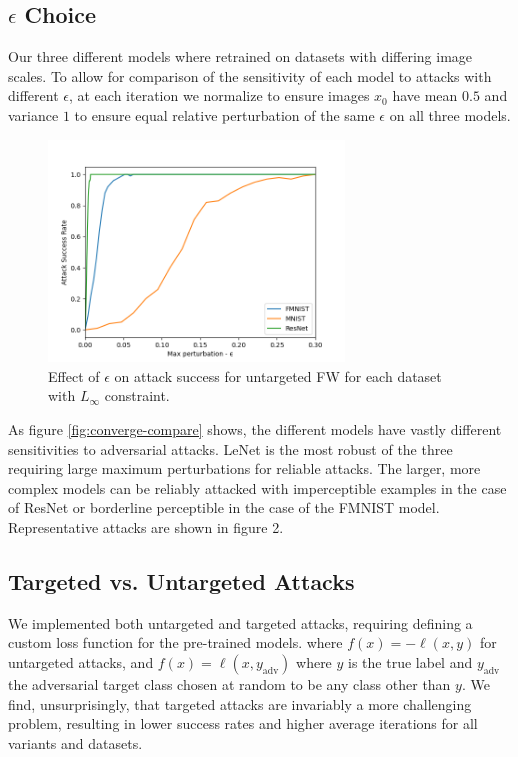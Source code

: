 \documentclass{article}
\begin{document}
\subsection{$\epsilon$ Choice}
Our three different models where retrained on datasets with differing image scales. To allow for comparison of the sensitivity of each model to attacks with different $\epsilon$, at each iteration we normalize to ensure images $x_0$ have mean $0.5$ and variance $1$ to ensure equal relative perturbation of the same $\epsilon$ on all three models. 

\begin{figure}[H]
    \centering
    \includegraphics[width=0.7\textwidth]{plots/eps_choice.png}
    \caption{Effect of $\epsilon$ on attack success for untargeted FW for each dataset with $L_\infty$ constraint.}
    \label{fig:eps}
\end{figure}

As figure \ref{fig:converge-compare} shows, the different models have vastly different sensitivities to adversarial attacks. LeNet is the most robust of the three requiring large maximum perturbations for reliable attacks. The larger, more complex models can be reliably attacked with imperceptible examples in the case of ResNet or borderline perceptible in the case of the FMNIST model. Representative attacks are shown in figure 2.

\subsection{Targeted vs. Untargeted Attacks}
We implemented both untargeted and targeted attacks, requiring defining a custom loss function for the pre-trained models. where $f(x) = -\ell(x, y)$ for untargeted attacks, and $f(x) = \ell(x, y_\text{adv})$ where $y$ is the true label and $y_\text{adv}$ the adversarial target class chosen at random to be any class other than $y$. We find, unsurprisingly, that targeted attacks are invariably a more challenging problem, resulting in lower success rates and higher average iterations for all variants and datasets.
\end{document}
